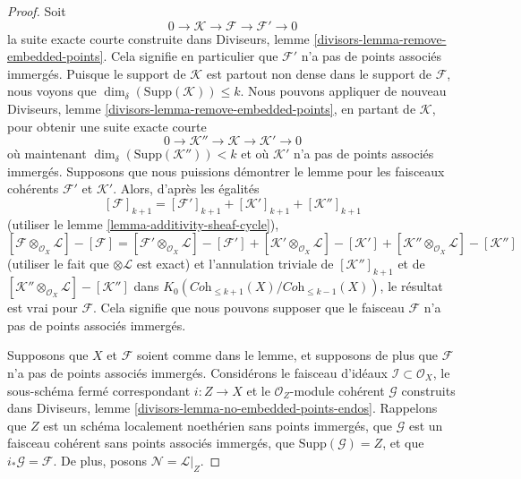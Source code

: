 \begin{proof}
Soit
$$
0 \to \mathcal{K} \to \mathcal{F} \to \mathcal{F}' \to 0
$$
la suite exacte courte construite dans
Diviseurs, lemme \ref{divisors-lemma-remove-embedded-points}.
Cela signifie en particulier que $\mathcal{F}'$ n'a pas de points
associés immergés.
Puisque le support de $\mathcal{K}$ est partout non dense dans le
support de $\mathcal{F}$, nous voyons que
$\dim_\delta(\text{Supp}(\mathcal{K})) \leq k$. Nous pouvons
appliquer de nouveau
Diviseurs, lemme \ref{divisors-lemma-remove-embedded-points},
en partant de $\mathcal{K}$, pour obtenir une suite exacte courte
$$
0 \to \mathcal{K}'' \to \mathcal{K} \to \mathcal{K}' \to 0
$$
où maintenant $\dim_\delta(\text{Supp}(\mathcal{K}'')) < k$
et où $\mathcal{K}'$ n'a pas de points associés immergés.
Supposons que nous puissions démontrer le lemme pour les faisceaux cohérents
$\mathcal{F}'$ et $\mathcal{K}'$. Alors, d'après
les égalités
$$
[\mathcal{F}]_{k + 1}
=
[\mathcal{F}']_{k + 1}
+ [\mathcal{K}']_{k + 1}
+ [\mathcal{K}'']_{k + 1}
$$
(utiliser le lemme \ref{lemma-additivity-sheaf-cycle}),
$$
[\mathcal{F} \otimes_{\mathcal{O}_X} \mathcal{L}]
-
[\mathcal{F}]
=
[\mathcal{F}' \otimes_{\mathcal{O}_X} \mathcal{L}]
-
[\mathcal{F}']
+
[\mathcal{K}' \otimes_{\mathcal{O}_X} \mathcal{L}]
-
[\mathcal{K}']
+
[\mathcal{K}'' \otimes_{\mathcal{O}_X} \mathcal{L}]
-
[\mathcal{K}'']
$$
(utiliser le fait que $\otimes \mathcal{L}$ est exact)
et l'annulation triviale de $[\mathcal{K}'']_{k + 1}$ et de
$[\mathcal{K}'' \otimes_{\mathcal{O}_X} \mathcal{L}]
- [\mathcal{K}'']$ dans
$K_0(\textit{Coh}_{\leq k + 1}(X)/\textit{Coh}_{\leq k - 1}(X))$,
le résultat est vrai
pour $\mathcal{F}$. Cela signifie que nous pouvons supposer que
le faisceau $\mathcal{F}$ n'a pas de points associés immergés.

\medskip\noindent
Supposons que $X$ et $\mathcal{F}$ soient comme dans le lemme, et supposons de plus
que $\mathcal{F}$ n'a pas de points associés immergés. Considérons le
faisceau d'idéaux $\mathcal{I} \subset \mathcal{O}_X$, le sous-schéma fermé
correspondant $i : Z \to X$ et le $\mathcal{O}_Z$-module cohérent
$\mathcal{G}$ construits dans
Diviseurs, lemme \ref{divisors-lemma-no-embedded-points-endos}.
Rappelons que $Z$ est un schéma localement noethérien sans points immergés,
que $\mathcal{G}$ est un faisceau cohérent sans points
associés immergés, que $\text{Supp}(\mathcal{G}) = Z$,
et que $i_*\mathcal{G} = \mathcal{F}$.
De plus, posons $\mathcal{N} = \mathcal{L}|_Z$.


\end{proof}
